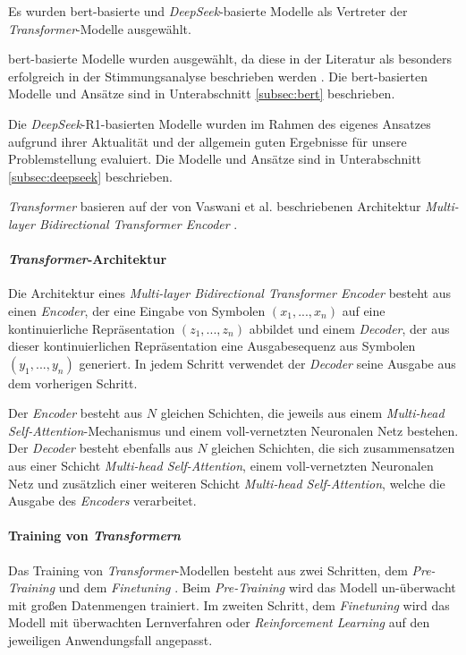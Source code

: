 Es wurden \gls{bert}-basierte und \textit{DeepSeek}-basierte Modelle als Vertreter der \textit{Transformer}-Modelle ausgewählt.

\gls{bert}-basierte Modelle wurden ausgewählt, da diese in der Literatur als besonders erfolgreich in der Stimmungsanalyse beschrieben werden \cite{devlin2018bert}.
Die \gls{bert}-basierten Modelle und Ansätze sind in Unterabschnitt \ref{subsec:bert} beschrieben.

Die \textit{DeepSeek}-R1-basierten Modelle wurden im Rahmen des eigenes Ansatzes aufgrund ihrer Aktualität und der allgemein guten Ergebnisse für unsere Problemstellung evaluiert.
Die Modelle und Ansätze sind in Unterabschnitt \ref{subsec:deepseek} beschrieben.

\textit{Transformer} basieren auf der von Vaswani et al. beschriebenen Architektur \textit{Multi-layer Bidirectional Transformer Encoder} \cite{vaswani2017attention}.

\paragraph{\textit{Transformer}-Architektur}
Die Architektur eines \textit{Multi-layer Bidirectional Transformer Encoder} besteht aus einen \textit{Encoder}, der eine Eingabe von Symbolen $(x_1,...,x_n)$ auf eine kontinuierliche Repräsentation $(z_1,...,z_n)$ abbildet und einem \textit{Decoder}, der aus dieser kontinuierlichen Repräsentation eine Ausgabesequenz aus Symbolen $(y_1,...,y_n)$ generiert.
In jedem Schritt verwendet der \textit{Decoder} seine Ausgabe aus dem vorherigen Schritt.

Der \textit{Encoder} besteht aus $N$ gleichen Schichten, die jeweils aus einem \textit{Multi-head Self-Attention}-Mechanismus und einem voll-vernetzten Neuronalen Netz bestehen.
Der \textit{Decoder} besteht ebenfalls aus $N$ gleichen Schichten, die sich zusammensatzen aus einer Schicht \textit{Multi-head Self-Attention}, einem voll-vernetzten Neuronalen Netz und zusätzlich einer weiteren Schicht \textit{Multi-head Self-Attention}, welche die Ausgabe des \textit{Encoders} verarbeitet.

\paragraph{Training von \textit{Transformern}}

Das Training von \textit{Transformer}-Modellen besteht aus zwei Schritten, dem \textit{Pre-Training} und dem \textit{Finetuning} \cite{Radford2018ImprovingLU}.
Beim \textit{Pre-Training} wird das Modell un-überwacht mit großen Datenmengen trainiert.
Im zweiten Schritt, dem \textit{Finetuning} wird das Modell mit überwachten Lernverfahren oder \textit{Reinforcement Learning} \cite{deepseekai2025deepseekr1incentivizingreasoningcapability, devlin2018bert} auf den jeweiligen Anwendungsfall angepasst.


